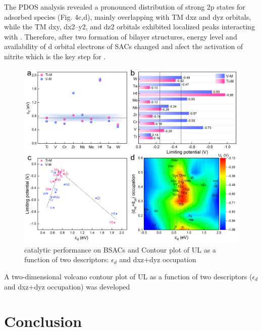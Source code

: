 \documentclass[isoft]{ufgtexposter}
\begin{document}
\begin{poster}
                    \vspace{10pt}
                The PDOS analysis revealed a pronounced distribution of strong 2p states for adsorbed  species (Fig. 4c,d), mainly overlapping with TM dxz and dyz orbitals, while the TM dxy, dx2–y2, and dz2 orbitals exhibited localized peaks interacting with . Therefore, after two formation of bilayer structures, energy level and availability of d orbital electrons of SACs changed and afect the activation of nitrite which is the key step for . 

            \begin{figure}
            \centering
            \captionsetup{type=figure}
            \includegraphics[scale=2]{images/Picture5.png}
            \caption{  catalytic performance on BSACs and Contour plot of UL as a function of two descriptors: $\epsilon_d$ and dxz+dyz occupation}
            \label{fig:lstm}
        \end{figure}
        \vspace{10pt}
 A two-dimensional volcano contour plot of UL as a function of two descriptors ($\epsilon_d$ and dxz+dyz occupation) was developed 
                
        \section{Conclusion}
 

\end{poster}
\end{document}
